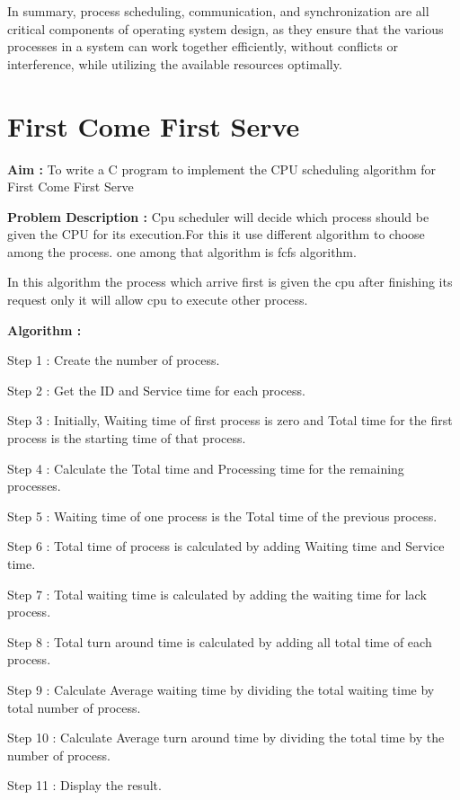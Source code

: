 \documentclass[journal,onecolumn]{IEEEtran}
\begin{document}
In summary, process scheduling, communication, and synchronization are all critical components of operating system design, as they ensure that the various processes in a system can work together efficiently, without conflicts or interference, while utilizing the available resources optimally.


\section{First Come First Serve}
\textbf{Aim : } To write a C program to implement the CPU scheduling algorithm for First Come First Serve

\textbf{Problem Description : }
Cpu scheduler will decide which process should be given the CPU for its execution.For this it use different algorithm to choose among the process. one among that algorithm is fcfs algorithm.

In this algorithm the process which arrive first is given the cpu after finishing its request only it will allow cpu to execute other process.

\textbf{Algorithm : }
\begin{list}{}{}
  \item Step 1 : Create the number of process.
  \item Step 2 : Get the ID and Service time for each process.
  \item Step 3 : Initially, Waiting time of first process is zero and Total time for the
        first process is the starting time of that process.
  \item Step 4 : Calculate the Total time and Processing time for the remaining
        processes.
  \item Step 5 : Waiting time of one process is the Total time of the previous
        process.
  \item Step 6 : Total time of process is calculated by adding Waiting time and Service
        time.
  \item Step 7 : Total waiting time is calculated by adding the waiting time for lack
        process.
  \item Step 8 : Total turn around time is calculated by adding all total time of each
        process.
  \item Step 9 : Calculate Average waiting time by dividing the total waiting time by
        total number of process.
  \item Step 10 : Calculate Average turn around time by dividing the total time by
        the number of process.
  \item Step 11 : Display the result.
\end{list}
\end{document}

